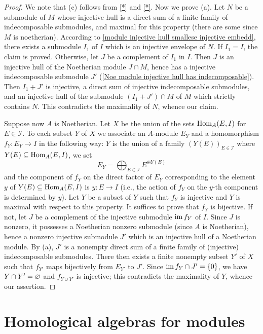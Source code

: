 \begin{proof}
We note that (c) follows from \cref{*} and \cref{*}. Now we prove (a). Let $N$ be a submodule of $M$ whose injective hull is a direct sum of a finite family of indecomposable submodules, and maximal for this property (there are some since $M$ is noetherian). According to \cref{module injective hull smallese injective embedd}, there exists a submodule $I_1$ of $I$ which is an injective envelope of $N$. If $I_1=I$, the claim is proved. Otherwise, let $J$ be a complement of $I_1$ in $I$. Then $J$ is an injective hull of the Noetherian module $J\cap M$, hence has a injective indecomposable submodule $J'$ (\cref{Noe module injective hull has indecomposable}). Then $I_1+J'$ is injective, a direct sum of injective indecomposable submodules, and an injective hull of the submodule $(I_1+J')\cap M$ of $M$ which strictly contains $N$. This contradicts the maximality of $N$, whence our claim.\par
Suppose now $A$ is Noetherian. Let $X$ be the union of the sets $\mathrm{Hom}_A(E,I)$ for $E\in\mathscr{I}$. To each subset $Y$ of $X$ we associate an $A$-module $E_Y$ and a homomorphism $f_Y:E_Y\to I$ in the following way: $Y$ is the union of a family $(Y(E))_{E\in\mathscr{I}}$ where $Y(E)\subseteq\mathrm{Hom}_A(E,I)$, we set
\[E_Y=\bigoplus_{E\in\mathscr{I}}E^{\oplus Y(E)}\]
and the component of $f_Y$ on the direct factor of $E_Y$ corresponding to the element $y$ of $Y(E)\subseteq\mathrm{Hom}_A(E,I)$ is $y:E\to I$ (i.e., the action of $f_Y$ on the $y$-th component is determined by $y$). Let $Y$ be a subset of $Y$ such that $f_Y$ is injective and $Y$ is maximal with respect to this property. It suffices to prove that $f_Y$ is bijective. If not, let $J$ be a complement of the injective submodule $\operatorname{im} f_Y$ of $I$. Since $J$ is nonzero, it possesses a Noetherian nonzero submodule (since $A$ is Noetherian), hence a nonzero injective submodule $J'$ which is an injective hull of a Noetherian module. By (a), $J'$ is a nonempty direct sum of a finite family of (injective) indecomposable submodules. There then exists a finite nonempty subset $Y'$ of $X$ such that $f_{Y'}$ maps bijectively from $E_{Y'}$ to $J'$. Since $\operatorname{im} f_{Y}\cap J'=\{0\}$, we have $Y\cap Y'=\varnothing$ and $f_{Y\cup Y'}$ is injective; this contradicts the maximality of $Y$, whence our assertion.
\end{proof}
\chapter{Homological algebras for modules}
